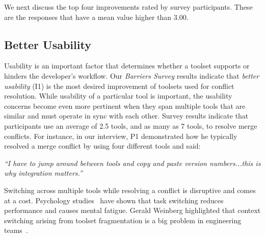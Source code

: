 We next discuss the top four improvements rated by survey participants. These are the responses that have a mean value higher than $3.00$.

\vspace{0.5cm}
\subsection{Better Usability}\label{better_usability}
Usability is an important factor that determines whether a toolset supports or hinders the developer's workflow.
Our \textit{Barriers Survey} results indicate that \textit{better usability} (I1) is the most desired improvement of toolsets used for conflict resolution. 
While usability of a particular tool is important, the usability concerns become even more pertinent when they span multiple tools that are similar and must operate in sync with each other.
Survey results indicate that participants use an average of 2.5 tools, and as many as 7 tools, to resolve merge conflicts.
For instance, in our interview, P1 demonstrated how he typically resolved a merge conflict by using four different tools and said: 
\begin{quoting}
\textit{``I have to jump around between tools and copy and paste version numbers...this is why integration matters.''}
\end{quoting}

Switching across multiple tools while resolving a conflict is disruptive and comes at a cost. 
Psychology studies~\cite{Meiran2000,gopher2000switching} have shown that task switching reduces performance and causes mental fatigue. 
Gerald Weinberg highlighted that context switching arising from toolset fragmentation is a big problem in engineering teams~\cite{Weinberg1992}. 


